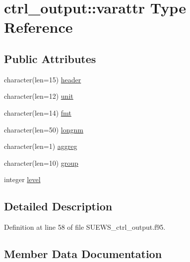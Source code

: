 \hypertarget{structctrl__output_1_1varattr}{}\section{ctrl\+\_\+output\+:\+:varattr Type Reference}
\label{structctrl__output_1_1varattr}
\subsection*{Public Attributes}
\begin{DoxyCompactItemize}
\item 
character(len=15) \hyperlink{structctrl__output_1_1varattr_ac5d564a1b51aca6652ee5999d86ee3c5}{header}
\item 
character(len=12) \hyperlink{structctrl__output_1_1varattr_aa0d2944f6f1767e7e856831c96f4dffb}{unit}
\item 
character(len=14) \hyperlink{structctrl__output_1_1varattr_a1939d217311a5e0fb5571efdc8df0f42}{fmt}
\item 
character(len=50) \hyperlink{structctrl__output_1_1varattr_ad9c9880260734807056c2bc27806a5ec}{longnm}
\item 
character(len=1) \hyperlink{structctrl__output_1_1varattr_aa72f69bfd2f35d9815ceb0bcaf344f5c}{aggreg}
\item 
character(len=10) \hyperlink{structctrl__output_1_1varattr_af5c0a029bc5b7de926c9f771ecbaa16e}{group}
\item 
integer \hyperlink{structctrl__output_1_1varattr_a0b8734fea9cd4b6406b8faf8dc16c6d8}{level}
\end{DoxyCompactItemize}


\subsection{Detailed Description}


Definition at line 58 of file S\+U\+E\+W\+S\+\_\+ctrl\+\_\+output.\+f95.



\subsection{Member Data Documentation}
\mbox{\label{structctrl__output_1_1varattr_aa72f69bfd2f35d9815ceb0bcaf344f5c}} 
